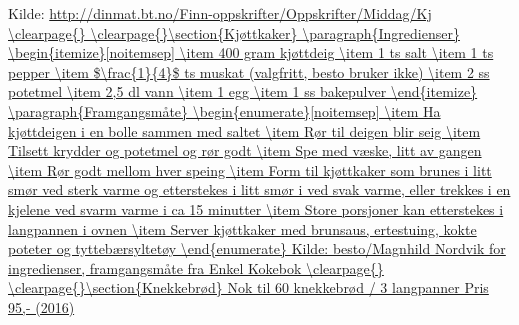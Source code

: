 \documentclass[12pt,a4paper]{book}
\begin{document}
Kilde: \url{http://dinmat.bt.no/Finn-oppskrifter/Oppskrifter/Middag/Kj
\clearpage{}
\clearpage{}\section{﻿Kjøttkaker}


\paragraph{Ingredienser}
\begin{itemize}[noitemsep]
	\item 400 gram kjøttdeig
	\item 1 ts salt
	\item 1 ts pepper
	\item $\frac{1}{4}$  ts muskat (valgfritt, besto bruker ikke)
	\item 2 ss potetmel
	\item 2,5 dl vann
	\item 1 egg
	\item 1 ss bakepulver
\end{itemize}

\paragraph{Framgangsmåte}
\begin{enumerate}[noitemsep]
	\item Ha kjøttdeigen i en bolle sammen med saltet
	\item Rør til deigen blir seig
	\item Tilsett krydder og potetmel og rør godt
	\item Spe med væske, litt av gangen
	\item Rør godt mellom hver speing
	\item Form til kjøttkaker som brunes i litt smør ved sterk varme og etterstekes i litt smør i ved svak varme, eller trekkes i en kjelene ved svarm varme i ca 15 minutter
	\item Store porsjoner kan etterstekes i langpannen i ovnen
	\item Server kjøttkaker med brunsaus, ertestuing, kokte poteter og tyttebærsyltetøy
\end{enumerate}


Kilde: besto/Magnhild Nordvik for ingredienser, framgangsmåte fra Enkel Kokebok
\clearpage{}
\clearpage{}\section{﻿Knekkebrød}
Nok til 60 knekkebrød / 3 langpanner
Pris 95,- (2016)

}
\end{document}
